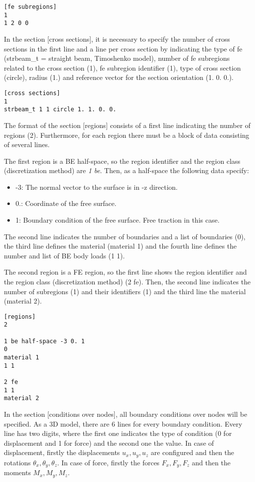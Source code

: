 \documentclass[a4]{article}
\begin{document}
\begin{Verbatim}
[fe subregions]
1
1 2 0 0
\end{Verbatim}

In the section [cross sections], it is necessary to specify the number of cross sections in the first line and a line per cross section by indicating the type of fe (strbeam\_t = straight beam, Timoshenko model), number of fe subregions related to the cross section (1), fe subregion identifier (1), type of cross section (circle), radius (1.) and reference vector for the section orientation (1. 0. 0.).

\begin{Verbatim}
[cross sections]
1
strbeam_t 1 1 circle 1. 1. 0. 0.
\end{Verbatim}

The format of the section [regions] consists of a first line indicating the number of regions (2). Furthermore, for each region there must be a block of data consisting of several lines. 

The first region is a BE half-space, so the region identifier and the region class (discretization method) are \emph{1 be}. Then, as a half-space the following data specify:

\begin{itemize}
	\item -3: The normal vector to the surface is in -z direction.
	\item 0.: Coordinate of the free surface.
	\item 1: Boundary condition of the free surface. Free traction in this case. 
\end{itemize}

The second line indicates the number of boundaries and a list of boundaries (0), the third line defines the material (material 1) and the fourth line defines the number and list of BE body loads (1 1).

The second region is a FE region, so the first line shows the region identifier and the region class (discretization method) (2 fe). Then, the second line indicates the number of subregions (1) and their identifiers (1) and the third line the material (material 2). 

\begin{Verbatim}	
[regions]
2

1 be half-space -3 0. 1
0
material 1
1 1

2 fe
1 1
material 2
\end{Verbatim}

In the section [conditions over nodes], all boundary conditions over nodes will be specified. As a 3D model, there are 6 lines for every boundary condition. Every line has two digits, where the first one indicates the type of condition (0 for displacement and 1 for force) and the second one the value. In case of displacement, firstly the displacements $u_x, u_y, u_z$ are configured and then the rotations $\theta_x, \theta_y, \theta_z$. In case of force, firstly the forces $F_x, F_y, F_z$ and then the moments $M_x, M_y, M_z$. 
\end{document}
